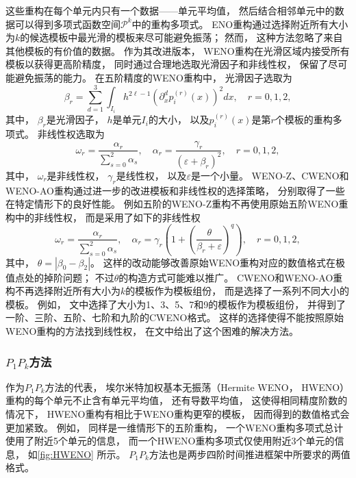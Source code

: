 这些重构在每个单元内只有一个数据——单元平均值，
然后结合相邻单元中的数据可以得到多项式函数空间$\mathcal{P}^k$中的重构多项式。
ENO重构通过选择附近所有大小为$k$的候选模板中最光滑的模板来尽可能避免振荡；
然而，
这种方法忽略了来自其他模板的有价值的数据。
作为其改进版本，
WENO重构在光滑区域内接受所有模板以获得更高阶精度，
同时通过合理地选取光滑因子和非线性权，
保留了尽可能避免振荡的能力。
在五阶精度的WENO重构中，
光滑因子选取为
\begin{equation}
  \beta_r= \sum_{d=1}^3 \int_{I_{i}}h^{2\ell-1}\left({\partial_{x}^{d}}p_{i}^{(r)}(x)\right)^2 dx,
  \quad r=0,1,2,
\end{equation}
其中，
$\beta_{{r}}$是光滑因子，
$h$是单元$I_i$的大小，
以及$p_{i}^{(r)}(x)$是第$r$个模板的重构多项式。
非线性权选取为
\begin{equation}
  \omega_{{r}}=\frac{\alpha_{{r}}}{\sum_{s=0}^{2}\alpha_{{s}}}, \quad
  \alpha_{{r}}=\frac{\gamma_{{r}}}{\left(\varepsilon+\beta_{{r}}\right)^2}, \quad {{r}}=0,1,2,
\end{equation}
其中，
$\omega_{{r}}$是非线性权，
$\gamma_{{r}}$是线性权，
以及$\varepsilon$是一个小量。
WENO-Z、CWENO和WENO-AO重构通过进一步的改进模板和非线性权的选择策略，
分别取得了一些在特定情形下的良好性能。
例如五阶的WENO-Z重构不再使用原始五阶WENO重构中的非线性权，
而是采用了如下的非线性权
\begin{equation}
  \omega_{{r}}=\frac{\alpha_{{r}}}{\sum_{s=0}^{2}\alpha_{{s}}}, \quad
  \alpha_{{r}}=\gamma_{{r}}\left( 1+\left( \frac{\theta}{\beta_{{r}}+\varepsilon}\right)^q \right) , \quad {{r}}=0,1,2,
\end{equation}
其中，
$\theta = |\beta_{0}-\beta_{2}|$。
这样的改动能够改善原始WENO重构对应的数值格式在极值点处的掉阶问题；
不过$\theta$的构造方式可能难以推广。
CWENO和WENO-AO重构不再选择附近所有大小为$k$的模板作为模板组份，
而是选择了一系列不同大小的模板。
例如，
文\cite{CWENO13579}中选择了大小为1、3、5、7和9的模板作为模板组份，
并得到了一阶、三阶、五阶、七阶和九阶的CWENO格式。
这样的选择使得不能按照原始WENO重构的方法找到线性权，
在文\cite{WENOAO}中给出了这个困难的解决方法。

\subsubsection{$P_1P_k$方法}

作为$P_1P_k$方法的代表，
埃尔米特加权基本无振荡（Hermite WENO，
HWENO）重构的每个单元不止含有单元平均值，
还有导数平均值，
这使得相同精度阶数的情况下，
HWENO重构有相比于WENO重构更窄的模板，
因而得到的数值格式会更加紧致。
例如，
同样是一维情形下的五阶重构，
一个WENO重构多项式总计使用了附近5个单元的信息，
而一个HWENO重构多项式仅使用附近3个单元的信息，
如\cref{fig:HWENO} 所示。
$P_1P_k$方法也是两步四阶时间推进框架中所要求的两值格式。

